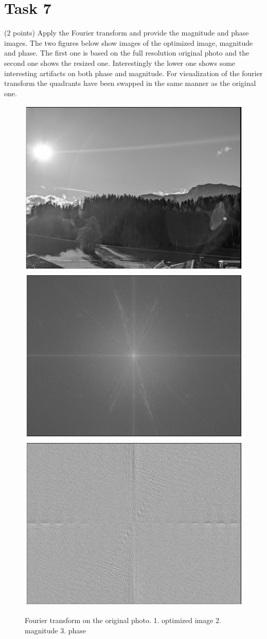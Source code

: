 \documentclass[UTF-8]{article}
\begin{document}
\section*{Task 7}
(2 points) Apply the Fourier transform and provide the magnitude and phase images.
The two figures below show images of the optimized image, magnitude and phase. The first one is based on the full resolution original photo and the second one shows the resized one. Interestingly the lower one shows some interesting artifacts on both phase and magnitude. For visualization of the fourier transform the quadrants have been swapped in the same manner as the original one.
	
\begin{figure}[H]
	\centering
	\includegraphics[width=0.5\linewidth]{fourier_orig_with_border}
	\includegraphics[width=0.5\linewidth]{fourier_orig_magnitude.png}
	\includegraphics[width=0.5\linewidth]{fourier_orig_phase.png}
	\caption{Fourier transform on the original photo. 1. optimized image 2. magnitude 3. phase}
	\label{fig:fourierorigwithborder}
\end{figure}
\end{document}
